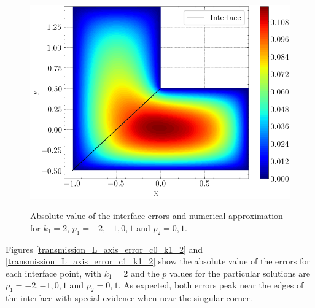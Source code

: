 \begin{figure}[!htb]
    \begin{minipage}{.6\textwidth}
      \centering
      \includegraphics[width=\linewidth]{Images/Transmission/L_shape_2_axis_sol_k1_2_enr.png}
      \label{transmission_L_axis_plot_k1_2}
    \end{minipage}
    
    \caption*{Absolute value of the interface errors and numerical approximation for \(k_1=2\), \(p_1=-2, -1, 0, 1\) and \(p_2 = 0, 1\).}
    \label{}
\end{figure}

Figures \ref{transmission_L_axis_error_c0_k1_2} and \ref{transmission_L_axis_error_c1_k1_2} show the absolute value of the errors for each interface point, with \(k_1=2\) and the \(p\) values for the particular solutions are \(p_1=-2, -1, 0, 1\) and \(p_2 = 0, 1\). As expected, both errors peak near the edges of the interface with special evidence when near the singular corner.